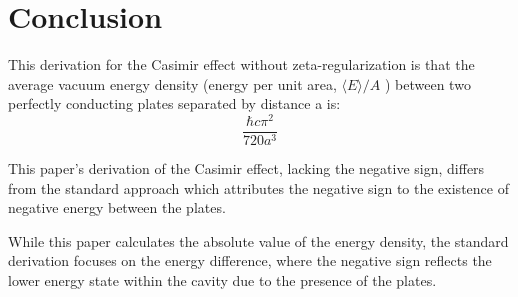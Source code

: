 \section{Conclusion}
This derivation for the Casimir effect without zeta-regularization is that the average vacuum energy density 
(energy per unit area, \(\langle E \rangle/A\) ) between two perfectly conducting plates separated by distance a is:
\[\frac{\hbar c \pi^2}{720 a^3}\]

This paper's derivation of the Casimir effect, lacking the negative sign,  
differs from the standard approach which attributes the negative sign to the existence of negative energy between the plates. 

While this paper calculates the absolute value of the energy density, the standard derivation focuses on the energy difference, 
where the negative sign reflects the lower energy state within the cavity due to the presence of the plates.